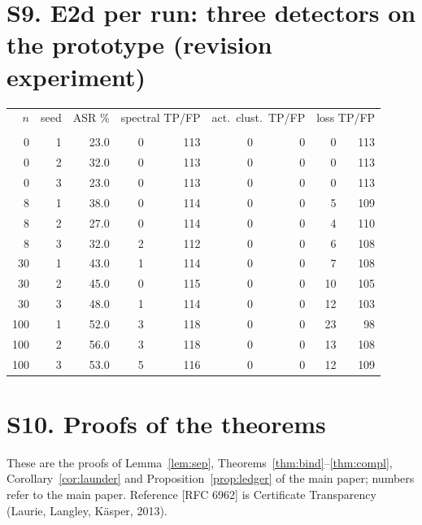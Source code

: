 \documentclass[10pt,a4paper]{article}
\begin{document}
\section{S9. E2d per run: three detectors on the prototype (revision experiment)}
\small\begin{longtable}{rrrrrrrrr}\toprule $n$ & seed & ASR \% & \multicolumn{2}{c}{spectral TP/FP} & \multicolumn{2}{c}{act.\ clust.\ TP/FP} & \multicolumn{2}{c}{loss TP/FP}\\\\\midrule
0 & 1 & 23.0 & 0 & 113 & 0 & 0 & 0 & 113\\
0 & 2 & 32.0 & 0 & 113 & 0 & 0 & 0 & 113\\
0 & 3 & 23.0 & 0 & 113 & 0 & 0 & 0 & 113\\
8 & 1 & 38.0 & 0 & 114 & 0 & 0 & 5 & 109\\
8 & 2 & 27.0 & 0 & 114 & 0 & 0 & 4 & 110\\
8 & 3 & 32.0 & 2 & 112 & 0 & 0 & 6 & 108\\
30 & 1 & 43.0 & 1 & 114 & 0 & 0 & 7 & 108\\
30 & 2 & 45.0 & 0 & 115 & 0 & 0 & 10 & 105\\
30 & 3 & 48.0 & 1 & 114 & 0 & 0 & 12 & 103\\
100 & 1 & 52.0 & 3 & 118 & 0 & 0 & 23 & 98\\
100 & 2 & 56.0 & 3 & 118 & 0 & 0 & 13 & 108\\
100 & 3 & 53.0 & 5 & 116 & 0 & 0 & 12 & 109\\
\bottomrule\end{longtable}\normalsize
\section{S10. Proofs of the theorems}
\label{sec:s10}
These are the proofs of Lemma~\ref{lem:sep}, Theorems~\ref{thm:bind}--\ref{thm:compl}, Corollary~\ref{cor:launder} and Proposition~\ref{prop:ledger} of the main paper; numbers refer to the main paper. Reference [RFC 6962] is Certificate Transparency (Laurie, Langley, K\"asper, 2013).
{\renewcommand{\cite}[1]{[RFC~6962]}}
\end{document}
